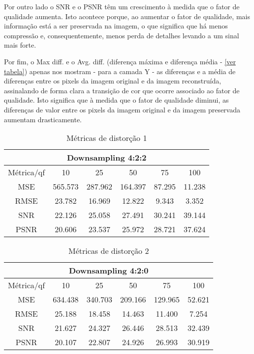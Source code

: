 \documentclass{article}
\begin{document}
Por outro lado o SNR e o PSNR têm um crescimento à medida que o fator de qualidade aumenta. Isto acontece porque, ao aumentar o fator de qualidade, mais informação está a ser preservada na imagem, o que significa que há menos compressão e, consequentemente, menos perda de detalhes levando a um sinal mais forte.

Por fim, o Max diff. e o Avg. diff. (diferença máxima e diferença média - \hyperref[tab:tabela6]{[ver tabela]}) apenas nos mostram - para a camada Y - as diferenças e a média de diferenças entre os pixels da imagem original e da imagem reconstruída, assinalando de forma clara a transição de cor que ocorre associado ao fator de qualidade. Isto significa que à medida que o fator de qualidade diminui, as diferenças de valor entre os pixels da imagem original e da imagem preservada aumentam drasticamente.

\begin{table}[H]
    \centering
    \begin{tabular}{|c|c|c|c|c|c|}
        \hline
        \multicolumn{6}{|c|}{Downsampling 4:2:2} \\
        \hline
        Métrica/qf & 10 & 25 & 50 & 75 & 100 \\
        \hline
        MSE & 565.573 & 287.962 & 164.397 & 87.295 & 11.238 \\
        \hline
        RMSE & 23.782 & 16.969 & 12.822 & 9.343 & 3.352 \\
        \hline
        SNR & 22.126 & 25.058 & 27.491 & 30.241 & 39.144 \\
        \hline
        PSNR & 20.606 & 23.537 & 25.972 & 28.721 & 37.624 \\
        \hline
    \end{tabular}
    \caption{Métricas de distorção 1}
    \label{tab:tabela4}
\end{table}

\begin{table}[H]
    \centering
    \begin{tabular}{|c|c|c|c|c|c|}
        \hline
        \multicolumn{6}{|c|}{Downsampling 4:2:0} \\
        \hline
        Métrica/qf & 10 & 25 & 50 & 75 & 100 \\
        \hline
        MSE & 634.438 & 340.703 & 209.166 & 129.965 & 52.621 \\
        \hline
        RMSE & 25.188 & 18.458 & 14.463 & 11.400 & 7.254 \\
        \hline
        SNR & 21.627 & 24.327 & 26.446 & 28.513 & 32.439 \\
        \hline
        PSNR & 20.107 & 22.807 & 24.926 & 26.993 & 30.919 \\
        \hline
    \end{tabular}
    \caption{Métricas de distorção 2}
    \label{tab:tabela5}
\end{table}
\end{document}
